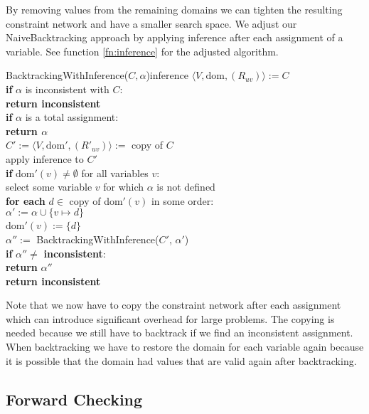 By removing values from the remaining domains we can tighten the resulting constraint network and have a smaller search space. We adjust our NaiveBacktracking approach by applying inference after each assignment of a variable. See function \ref{fn:inference} for the adjusted algorithm.

\begin{function}{BacktrackingWithInference($C, \alpha$)}{inference}
	$\langle V, \text{dom}, (R_{uv})\rangle := C$ \\
	\textbf{if} $\alpha$ is inconsistent with $C$: \\
	\null \qquad\textbf{return inconsistent} \\

	\textbf{if} $\alpha$ is a total assignment: \\
	\null \qquad\textbf{return $\alpha$} \\

	$C' := \langle V, \text{dom}',(R'_{uv})\rangle :=$ copy of $C$ \\
	apply inference to $C'$ \\
	\textbf{if} dom$'(v) \neq \emptyset$ for all variables $v$: \\
	\null \qquad select some variable $v$ for which $\alpha$ is not defined \\
	\null \qquad \textbf{for each} $d \in$ copy of dom$'(v)$ in some order: \\
	\null \qquad \qquad $\alpha' := \alpha \cup \{v \mapsto d\}$ \\
	\null \qquad \qquad dom$'(v) := \{d\}$ \\
	\null \qquad \qquad $\alpha'' := $ BacktrackingWithInference($C'$, $\alpha'$) \\
	\null \qquad \qquad \textbf{if} $\alpha'' \neq$ \textbf{inconsistent}: \\
	\null \qquad \qquad \qquad \textbf{return} $\alpha''$ \\

	\textbf{return inconsistent}
\end{function}

Note that we now have to copy the constraint network after each assignment which can introduce significant overhead for large problems. The copying is needed because we still have to backtrack if we find an inconsistent assignment. When backtracking we have to restore the domain for each variable again because it is possible that the domain had values that are valid again after backtracking.

\subsection{Forward Checking}

